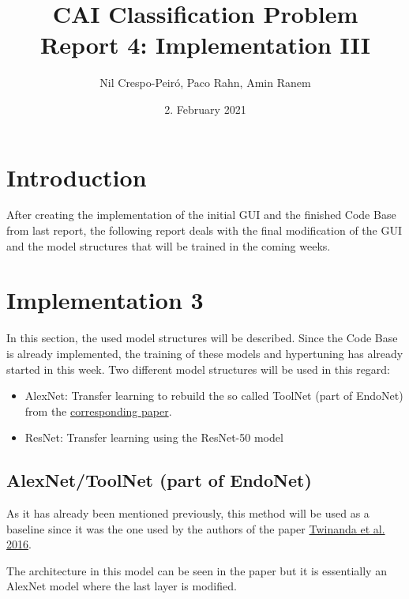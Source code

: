 \documentclass{article}
\title{CAI Classification Problem\\Report 4: Implementation III}
\author{Nil Crespo-Peiró, Paco Rahn, Amin Ranem}
\date{2. February 2021}
\begin{document}
\maketitle

\section{Introduction}
After creating the implementation of the initial GUI and the finished Code Base from last report, the following report deals with the final modification of the GUI and the model structures that will be trained in the coming weeks.


\section{Implementation 3}
In this section, the used model structures will be described. Since the Code Base is already implemented, the training of these models and hypertuning has already started in this week. Two different model structures will be used in this regard:
\begin{itemize}
    \item AlexNet: Transfer learning to rebuild the so called ToolNet (part of EndoNet) from the \href{https://arxiv.org/pdf/1602.03012.pdf}{corresponding paper}.
    \item ResNet: Transfer learning using the ResNet-50 model
\end{itemize}

\subsection{AlexNet/ToolNet (part of EndoNet)}
As it has already been mentioned previously, this method will be used as a baseline since it was the one used by the authors of the paper \href{https://arxiv.org/pdf/1602.03012.pdf}{Twinanda et al. 2016}.

\noindent The architecture in this model can be seen in the paper but it is essentially an AlexNet model where the last layer is modified.
\end{document}
